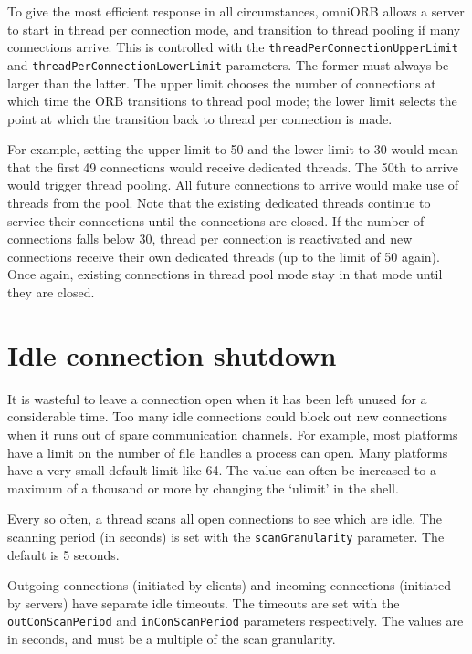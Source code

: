 \documentclass[11pt,twoside,a4paper]{book}
\newcommand{\code}[1]{\texttt{#1}}
\newcommand{\dsc}{\discretionary{}{}{}}
\begin{document}
To give the most efficient response in all circumstances, omniORB
allows a server to start in thread per connection mode, and transition
to thread pooling if many connections arrive. This is controlled with
the \code{threadPerConnection\dsc{}UpperLimit} and
\code{threadPerConnectionLowerLimit} parameters. The former must
always be larger than the latter. The upper limit chooses the number
of connections at which time the ORB transitions to thread pool mode;
the lower limit selects the point at which the transition back to
thread per connection is made.

For example, setting the upper limit to 50 and the lower limit to 30
would mean that the first 49 connections would receive dedicated
threads. The 50th to arrive would trigger thread pooling. All future
connections to arrive would make use of threads from the pool. Note
that the existing dedicated threads continue to service their
connections until the connections are closed. If the number of
connections falls below 30, thread per connection is reactivated and
new connections receive their own dedicated threads (up to the limit
of 50 again). Once again, existing connections in thread pool mode
stay in that mode until they are closed.


\section{Idle connection shutdown}
\label{sec:connShutdown}

It is wasteful to leave a connection open when it has been left unused
for a considerable time. Too many idle connections could block out new
connections when it runs out of spare communication channels. For
example, most platforms have a limit on the number of file handles a
process can open. Many platforms have a very small default limit like
64. The value can often be increased to a maximum of a thousand or
more by changing the `ulimit' in the shell.

Every so often, a thread scans all open connections to see which are
idle. The scanning period (in seconds) is set with the
\code{scanGranularity} parameter. The default is 5 seconds.

Outgoing connections (initiated by clients) and incoming connections
(initiated by servers) have separate idle timeouts.  The timeouts are
set with the \code{outConScan\dsc{}Period} and \code{inConScanPeriod}
parameters respectively. The values are in seconds, and must be a
multiple of the scan granularity.
\end{document}
